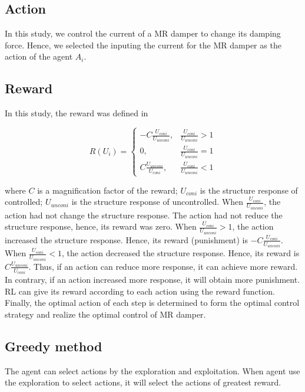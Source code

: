 \subsection{Action}

In this study, we control the current of a MR damper to change its damping force. Hence, we selected the inputing the current for the MR damper as the action of the agent $A_i$. 
\subsection{Reward}

In this study, the reward was defined in

\begin{equation}
R(U_i)=
\begin{cases}
-C \frac{U_{coni}}{U_{unconi}},  & \frac{U_{coni}}{U_{unconi}} > 1 \\
0, & \frac{U_{coni}}{U_{unconi}} = 1 \\
C \frac{U_{unconi}}{U_{coni}}, & \frac{U_{coni}}{U_{unconi}} < 1 
\end{cases}
\end{equation}

where $C$ is a magnification factor of the reward; $U_{coni}$ is the structure response of controlled; $U_{unconi}$ is the structure response of uncontrolled. When $ \frac{U_{coni}}{U_{unconi}} $, the action had not change the structure response. The action had not reduce the structure response, hence, its reward was zero. When $\frac{U_{coni}}{U_{unconi}} > 1$, the action increased the structure response. Hence, its reward (punishment) is $-C \frac{U_{coni}}{U_{unconi}}$. When $\frac{U_{coni}}{U_{unconi}} < 1$, the action decreased the structure response. Hence, its reward is $C \frac{U_{unconi}}{U_{coni}}$. Thus, if an action can reduce more response, it can achieve more reward. In contrary, if an action increased more response, it will obtain more punishment. RL can give its reward according to each action using the reward function. Finally, the optimal action of each step is determined to form the optimal control strategy and realize the optimal control of MR damper.

\subsection{Greedy method}
The agent can select actions by the exploration and exploitation. When agent use the exploration to select actions, it will select the actions of greatest reward.

